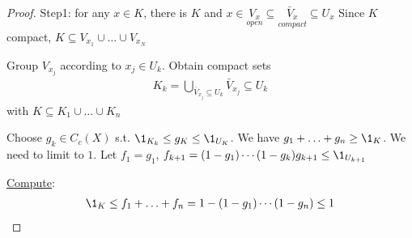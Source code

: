 \begin{proof}
	Step1: for any $x \in K$, there is $K$ and $x \in \underset{open}{V_x} \subseteq \underset{compact}{\bar{V}_x} \subseteq U_x$
	Since $K$ compact, $K \subseteq V_{x_{1}} \cup \ldots \cup V_{x_N}$

	Group $V_{x_j}$ according to $x_j \in U_{k}$. Obtain compact sets
	\begin{align*}
		K_k = \bigcup_{\bar{V}_{x_j} \subseteq U_k} \bar{V}_{x_j} \subseteq U_k
	\end{align*}
	with $K \subseteq K_1 \cup \ldots \cup K_n$


Choose $g_k \in C_{c} (X)$ s.t. $\1_{K_k} \leq g_K \leq \1_{U_{K}}$. We have $g_1 + \ldots + g_n \geq \1_{K}$. We need to limit to $1$.
Let $f_1 = g_1$, $f_{k+1} = (1-g_1) \cdots (1 - g_{k}) g_{k+1} \leq \1_{U_{k+1}}$

\underline{Compute}:
\begin{align*}
\1_K \leq f_1 + \ldots + f_n = 1 - (1 - g_1) \cdots (1 - g_n) \leq 1
\end{align*} 
\end{proof}



